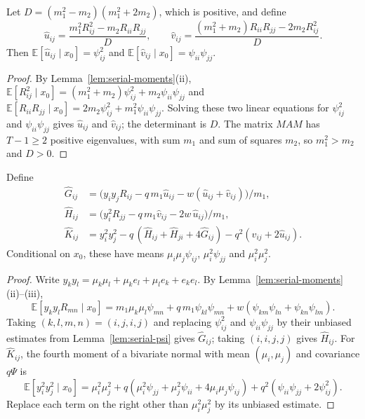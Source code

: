 \begin{lemma}\label{lem:serial-psi}
Let $D = (m_1^2 - m_2)(m_1^2 + 2m_2)$, which is positive, and define
\[
  \hat u_{ij} = \frac{m_1^2R_{ij}^2 - m_2R_{ii}R_{jj}}{D}, \qquad
  \hat v_{ij} = \frac{(m_1^2 + m_2)R_{ii}R_{jj} - 2m_2R_{ij}^2}{D}.
\]
Then $\mathbb{E}[\hat u_{ij} \mid x_0] = \psi_{ij}^2$ and $\mathbb{E}[\hat v_{ij} \mid x_0] = \psi_{ii}\psi_{jj}$.
\end{lemma}

\begin{proof}
By Lemma~\ref{lem:serial-moments}(ii), $\mathbb{E}[R_{ij}^2 \mid x_0] = (m_1^2 + m_2)\psi_{ij}^2 + m_2\psi_{ii}\psi_{jj}$ and $\mathbb{E}[R_{ii}R_{jj} \mid x_0] = 2m_2\psi_{ij}^2 + m_1^2\psi_{ii}\psi_{jj}$. Solving these two linear equations for $\psi_{ij}^2$ and $\psi_{ii}\psi_{jj}$ gives $\hat u_{ij}$ and $\hat v_{ij}$; the determinant is $D$. The matrix $MAM$ has $T - 1 \geq 2$ positive eigenvalues, with sum $m_1$ and sum of squares $m_2$, so $m_1^2 > m_2$ and $D > 0$.
\end{proof}

\begin{lemma}\label{lem:serial-mu}
Define
\begin{align*}
  \hat G_{ij} &= \bigl(y_iy_jR_{ij} - q\,m_1\hat u_{ij} - w(\hat u_{ij} + \hat v_{ij})\bigr)/m_1, \\
  \hat H_{ij} &= \bigl(y_i^2R_{jj} - q\,m_1\hat v_{ij} - 2w\,\hat u_{ij}\bigr)/m_1, \\
  \hat K_{ij} &= y_i^2y_j^2 - q\,(\hat H_{ij} + \hat H_{ji} + 4\hat G_{ij}) - q^2(\hat v_{ij} + 2\hat u_{ij}).
\end{align*}
Conditional on $x_0$, these have means $\mu_i\mu_j\psi_{ij}$, $\mu_i^2\psi_{jj}$ and $\mu_i^2\mu_j^2$.
\end{lemma}

\begin{proof}
Write $y_ky_l = \mu_k\mu_l + \mu_ke_l + \mu_le_k + e_ke_l$. By Lemma~\ref{lem:serial-moments}(ii)--(iii),
\[
  \mathbb{E}[y_ky_lR_{mn} \mid x_0] = m_1\mu_k\mu_l\psi_{mn} + q\,m_1\psi_{kl}\psi_{mn} + w(\psi_{km}\psi_{ln} + \psi_{kn}\psi_{lm}).
\]
Taking $(k,l,m,n) = (i,j,i,j)$ and replacing $\psi_{ij}^2$ and $\psi_{ii}\psi_{jj}$ by their unbiased estimates from Lemma~\ref{lem:serial-psi} gives $\hat G_{ij}$; taking $(i,i,j,j)$ gives $\hat H_{ij}$. For $\hat K_{ij}$, the fourth moment of a bivariate normal with mean $(\mu_i, \mu_j)$ and covariance $q\Psi$ is
\[
  \mathbb{E}[y_i^2y_j^2 \mid x_0] = \mu_i^2\mu_j^2 + q(\mu_i^2\psi_{jj} + \mu_j^2\psi_{ii} + 4\mu_i\mu_j\psi_{ij}) + q^2(\psi_{ii}\psi_{jj} + 2\psi_{ij}^2).
\]
Replace each term on the right other than $\mu_i^2\mu_j^2$ by its unbiased estimate.
\end{proof}

